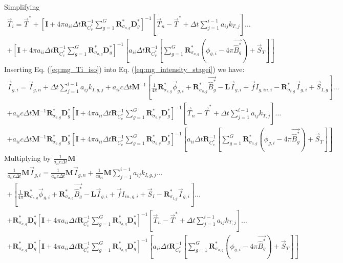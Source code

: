 \documentclass[11pt]{article}
\newcommand{\eqt}[1]{Eq. (\ref{#1})}
\newcommand{\M}{\ensuremath{ \mathbf M}}
\newcommand{\R}{\ensuremath{{\mathbf R}}}
\newcommand{\Rag}{\ensuremath{{\mathbf R}_{\sigma_{a,g}}^*}}
\newcommand{\Rsg}{\ensuremath{{\mathbf R}_{\sigma_{s,g}}^*}}
\newcommand{\Rtg}{\ensuremath{{\mathbf R}_{\sigma_{t,g}}^*}}
\newcommand{\Dg}{\ensuremath{ \mathbf D}^*_g}
\newcommand{\Pgvec}{\ensuremath{ \vec{\widehat{B}^*_g}}}
\newcommand{\I}{\ensuremath{\mathbf{I}}}
\begin{document}
%
Simplifying
%
\begin{multline}
\vec{T}_i = \vec{T}^* + \left[\I + 4\pi a_{ii} \Delta t \R_{C_v^*}^{-1} \sum_{g=1}^G{\Rag \Dg  }  \right]^{-1} \left[\vec{T}_n - \vec{T}^* + \Delta t \sum_{j=1}^{i-1}{a_{ij} k_{T,j}}\right] \dots \\
+ \left[\I + 4\pi a_{ii} \Delta t \R_{C_v^*}^{-1} \sum_{g=1}^G{\Rag \Dg  }  \right]^{-1}
\left[a_{ii} \Delta t \R_{C_v^*}^{-1} \left[ \sum_{g=1}^G{\Rag \left(\phi_{g,i} - 4\pi \Pgvec \right)  } + \vec{S}_T \right] \right] 
\label{eq:mg_Ti_iso}
\end{multline}
Inserting \eqt{eq:mg_Ti_iso} into \eqt{eq:mg_intensity_stagei} we have:
\begin{multline*}
\vec{I}_{g,i} = \vec{I}_{g,n} + \Delta t \sum_{j=1}^{i-1}{a_{ij} k_{I,g,j}} +
%
%
a_{ii}c\Delta t \M^{-1} \left[
\frac{1}{4\pi}\Rsg \vec{\phi}_{g,i} + \Rag \Pgvec - \mathbf{L}\vec{I}_{g,i} + \vec{f}I_{g,in,i} - \Rtg \vec{I}_{g,i} + \vec{S}_{I,g}   \right] \dots \\
%
+ a_{ii}c\Delta t \M^{-1} \Rag \Dg \left[\I + 4\pi a_{ii} \Delta t \R_{C_v^*}^{-1} \sum_{g=1}^G{\Rag \Dg  }   \right]^{-1} \left[\vec{T}_n - \vec{T}^* + \Delta t \sum_{j=1}^{i-1}{a_{ij} k_{T,j}}\right] \dots \\
%
%
+ a_{ii}c\Delta t \M^{-1} \Rag \Dg \left[\I + 4\pi a_{ii} \Delta t \R_{C_v^*}^{-1} \sum_{g=1}^G{\Rag \Dg }  \right]^{-1}
\left[a_{ii} \Delta t \R_{C_v^*}^{-1} \left[ \sum_{g=1}^G{\Rag \left(\phi_{g,i} - 4\pi \Pgvec \right)  } + \vec{S}_T \right] \right] 
\end{multline*}
%
%
Multiplying by $\frac{1}{a_{ii}c \Delta t}\M$
\begin{multline*}
\frac{1}{a_{ii}c\Delta t}\M\vec{I}_{g,i} = \frac{1}{a_{ii}c\Delta t}\M \vec{I}_{g,n} + \frac{1}{c a_{ii}} \M \sum_{j=1}^{i-1}{a_{ij} k_{I,g,j}} \dots \\
%
%
+ \left[
\frac{1}{4\pi}\Rsg \vec{\phi}_{g,i} + \Rag \Pgvec - \mathbf{ L}\vec{I}_{g,i} + \vec{f}I_{in,g,i} + \vec{S}_I - \Rtg \vec{I}_{g,i} \right] \dots \\
%
+  \Rag \Dg \left[\I + 4\pi a_{ii} \Delta t \R_{C_v^*}^{-1} \sum_{g=1}^G{\Rag \Dg  }   \right]^{-1} \left[\vec{T}_n - \vec{T}^* + \Delta t \sum_{j=1}^{i-1}{a_{ij} k_{T,j}}\right] \dots \\
%
%
+ \Rag \Dg \left[\I + 4\pi a_{ii} \Delta t \R_{C_v^*}^{-1} \sum_{g=1}^G{\Rag \Dg   }  \right]^{-1}
\left[a_{ii} \Delta t \R_{C_v^*}^{-1} \left[ \sum_{g=1}^G{\Rag \left(\phi_{g,i} - 4\pi \Pgvec \right)  } + \vec{S}_T \right] \right] 
\end{multline*}
\end{document}
